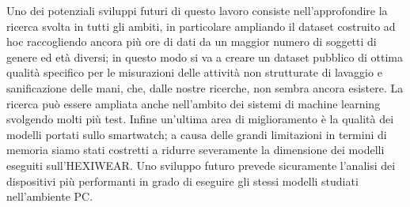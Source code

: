 Uno dei potenziali sviluppi futuri di questo lavoro consiste nell'approfondire la ricerca svolta in tutti gli ambiti, in particolare ampliando il dataset costruito ad hoc raccogliendo ancora più ore di dati da un maggior numero di soggetti di genere ed età diversi; in questo modo si va a creare un dataset pubblico di ottima qualità specifico per le misurazioni delle attività non strutturate di lavaggio e sanificazione delle mani, che, dalle nostre ricerche, non sembra ancora esistere.
La ricerca può essere ampliata anche nell'ambito dei sistemi di machine learning svolgendo molti più test. 
Infine un’ultima area di miglioramento è la qualità dei modelli portati sullo smartwatch; a causa delle grandi limitazioni in termini di memoria siamo stati costretti a ridurre severamente la dimensione dei modelli eseguiti sull'HEXIWEAR. Uno sviluppo futuro prevede sicuramente l’analisi dei dispositivi più performanti in grado di eseguire gli stessi modelli studiati nell’ambiente PC.